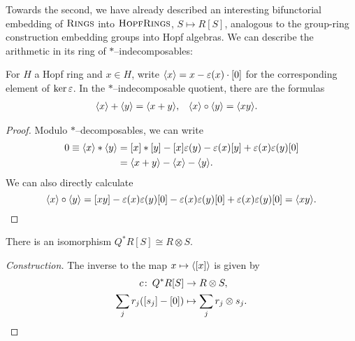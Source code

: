 Towards the second, we have already described an interesting bifunctorial embedding of \(\normalfont\textsc{Rings}\) into \(\normalfont\textsc{HopfRings}\), \(S \mapsto R[S]\), analogous to the group-ring construction embedding groups into Hopf algebras.  We can describe the arithmetic in its ring of \(\ast\)--indecomposables:

\begin{lemma}\label{ArithmeticInQAst}
For \(H\) a Hopf ring and \(x \in H\), write \(\langle x\rangle = x - \varepsilon(x) \cdot [0]\) for the corresponding element of \(\ker \varepsilon\).  In the \(\ast\)--indecomposable quotient, there are the formulas
\begin{align*}
\langle x\rangle + \langle y\rangle & = \langle x + y\rangle, &
\langle x\rangle \circ \langle y\rangle & = \langle x y\rangle.
\end{align*}
\end{lemma}
\begin{proof}
Modulo \(\ast\)--decomposables, we can write
\begin{align*}
0 \equiv \langle x\rangle \ast \langle y\rangle & = [x] \ast [y] - [x] \varepsilon(y) - \varepsilon(x) [y] + \varepsilon(x) \varepsilon(y) [0] \\
& = \langle x + y\rangle - \langle x\rangle - \langle y\rangle.
\end{align*}
We can also directly calculate \[\langle x\rangle \circ \langle y\rangle = [x y] - \varepsilon(x) \varepsilon(y) [0] - \varepsilon(x) \varepsilon(y) [0] + \varepsilon(x) \varepsilon(y) [0] = \langle x y\rangle. \qedhere\]
\end{proof}

\begin{corollary}\label{QAstAndTensors}
There is an isomorphism \(Q^* R[S] \cong R \otimes S\).
\end{corollary}
\begin{proof}[Construction]
The inverse to the map \(x \mapsto \langle[x]\rangle\) is given by
\begin{align*}
c\colon\thinspace Q^* R[S] & \to R \otimes S, \\
\sum_j r_j ([s_j] - [0]) & \mapsto \sum_j r_j \otimes s_j. \qedhere
\end{align*}
\end{proof}

